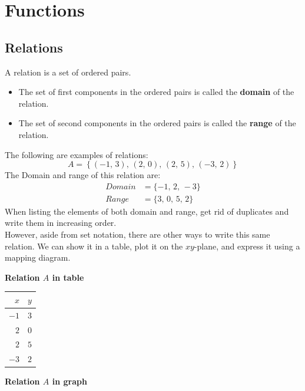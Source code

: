 \chapter{Functions}
\section{Relations}
A relation is a set of ordered pairs. 
\begin{itemize}
    \item The set of first components in the ordered pairs is called the \textbf{domain} of the relation.
    \item The set of second components in the ordered pairs is called the \textbf{range} of the relation.
\end{itemize}
The following are examples of relations:
\begin{equation*}
    A =\left\{(-1,\,3),\,(2,\,0),\,(2,\,5),\,(-3,\,2)\right\}
\end{equation*}
The Domain and range of this relation are:
\begin{align*}
    Domain&=\{-1,\, 2,\, -3\} \\
    Range &= \{3,\,0,\,5,\, 2\}
\end{align*}
When listing the elements of both domain and range, get rid of duplicates and write them in increasing order.\\
However, aside from set notation, there are other ways to write this same relation. We can show it in a table, plot it on the $xy$-plane, and express it using a mapping diagram.

\vspace{0.2cm}
\textbf{Relation $A$ in table}
\begin{center}
    \begin{tabular}{r|c}
        $x$ & $y$ \\ \hline
        $-1$ & $3$\\
        $2$ &  $0$\\
        $2$ & $5$\\
        $-3$ & $2$
    \end{tabular}
\end{center}
\newpage
\vspace{0.2cm}
\textbf{Relation $A$ in graph}
\begin{center}
\end{center}

